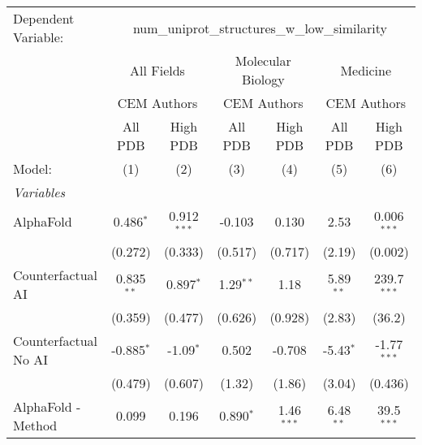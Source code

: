 \begingroup
\centering
\begin{tabular}{lcccccc}
   \tabularnewline \midrule \midrule
   Dependent Variable: & \multicolumn{6}{c}{num\_uniprot\_structures\_w\_low\_similarity}\\
 & \multicolumn{2}{c}{All Fields} & \multicolumn{2}{c}{Molecular Biology} & \multicolumn{2}{c}{Medicine} \\
\cmidrule(lr){2-3} \cmidrule(lr){4-5} \cmidrule(lr){6-7}
 & \multicolumn{2}{c}{CEM Authors} & \multicolumn{2}{c}{CEM Authors} & \multicolumn{2}{c}{CEM Authors} \\
\cmidrule(lr){2-3} \cmidrule(lr){4-5} \cmidrule(lr){6-7}
 & \multicolumn{1}{c}{All PDB} & \multicolumn{1}{c}{High PDB} & \multicolumn{1}{c}{All PDB} & \multicolumn{1}{c}{High PDB} & \multicolumn{1}{c}{All PDB} & \multicolumn{1}{c}{High PDB} \\
\cmidrule(lr){2-2} \cmidrule(lr){3-3} \cmidrule(lr){4-4} \cmidrule(lr){5-5} \cmidrule(lr){6-6} \cmidrule(lr){7-7}
   Model:                                                     & (1)           & (2)           & (3)           & (4)          & (5)           & (6)\\  
   \midrule
   \emph{Variables}\\
   AlphaFold                                                  & 0.486$^{*}$   & 0.912$^{***}$ & -0.103        & 0.130        & 2.53          & 0.006$^{***}$\\   
                                                              & (0.272)       & (0.333)       & (0.517)       & (0.717)      & (2.19)        & (0.002)\\   
   Counterfactual AI                                          & 0.835$^{**}$  & 0.897$^{*}$   & 1.29$^{**}$   & 1.18         & 5.89$^{**}$   & 239.7$^{***}$\\   
                                                              & (0.359)       & (0.477)       & (0.626)       & (0.928)      & (2.83)        & (36.2)\\   
   Counterfactual No AI                                       & -0.885$^{*}$  & -1.09$^{*}$   & 0.502         & -0.708       & -5.43$^{*}$   & -1.77$^{***}$\\   
                                                              & (0.479)       & (0.607)       & (1.32)        & (1.86)       & (3.04)        & (0.436)\\   
   AlphaFold - Method                                         & 0.099         & 0.196         & 0.890$^{*}$   & 1.46$^{***}$ & 6.48$^{**}$   & 39.5$^{***}$\\   

\end{tabular}
